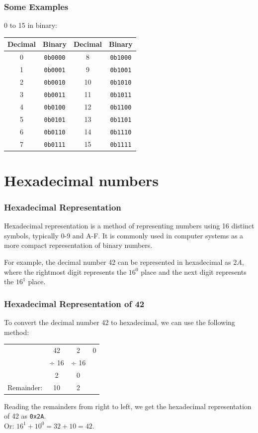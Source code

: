 \documentclass{beamer}
\begin{document}
\begin{frame}
  \frametitle{Some Examples}
  0 to 15 in binary:
\begin{center}
  \begin{tabular}{ | c | c | c | c | }
    \hline
    Decimal & Binary & Decimal & Binary \\ \hline
    0 & \texttt{0b0000} & 8  & \texttt{0b1000} \\ \hline
    1 & \texttt{0b0001} & 9  & \texttt{0b1001} \\ \hline
    2 & \texttt{0b0010} & 10 & \texttt{0b1010} \\ \hline
    3 & \texttt{0b0011} & 11 & \texttt{0b1011} \\ \hline
    4 & \texttt{0b0100} & 12 & \texttt{0b1100} \\ \hline
    5 & \texttt{0b0101} & 13 & \texttt{0b1101} \\ \hline
    6 & \texttt{0b0110} & 14 & \texttt{0b1110} \\ \hline
    7 & \texttt{0b0111} & 15 & \texttt{0b1111} \\ \hline
  \end{tabular}
\end{center}
\end{frame}
\label{sec:hexadecimal_numbers}
\section{Hexadecimal numbers}
\begin{frame}
\frametitle{Hexadecimal Representation}
Hexadecimal representation is a method of representing numbers using 16 distinct symbols, typically 0-9 and A-F. It is commonly used in computer systems as a more compact representation of binary numbers.

For example, the decimal number 42 can be represented in hexadecimal as \textbf{$2A$}, where the rightmost digit represents the \textbf{$16^0$} place and the next digit represents the \textbf{$16^1$} place.
\end{frame}
\begin{frame}
\frametitle{Hexadecimal Representation of 42}
To convert the decimal number 42 to hexadecimal, we can use the following method:

\vspace{0.5cm}

\begin{tabular}{c c c c }
&42 & 2 & 0\\
&÷ 16 & ÷ 16 &\\ \hline
&2 & 0 &\\
Remainder: & 10 & 2 &\\
\end{tabular}
\vspace{0.5cm}

Reading the remainders from right to left, we get the hexadecimal representation of 42 as \texttt{0x2A}.\\Or: $16^1 + 10^0 = 32 + 10 = 42$.
\end{frame}
\end{document}
